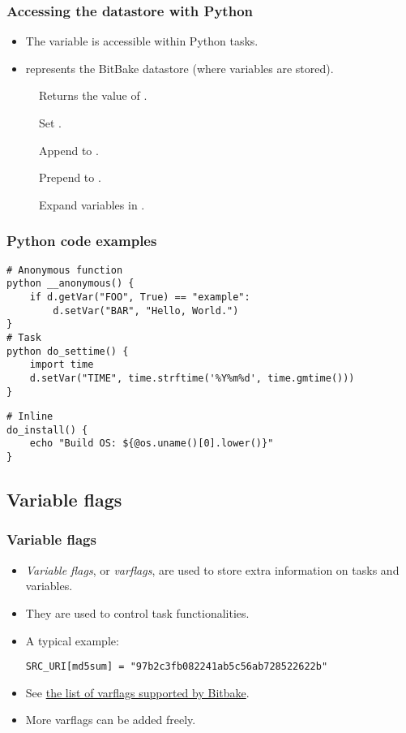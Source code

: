 \begin{frame}
  \frametitle{Accessing the datastore with Python}
  \begin{itemize}
    \item The  variable is accessible within Python tasks.
    \item {} represents the BitBake datastore (where variables are
      stored).
  \end{itemize}
  \begin{description}
    \item[] Returns the value of
      .
    \item[] Set .
    \item[] Append  to
      .
    \item[] Prepend  to
      .
    \item[] Expand variables in
      .
  \end{description}
\end{frame}

\begin{frame}[fragile]
  \frametitle{Python code examples}
  \begin{verbatim}
# Anonymous function
python __anonymous() {
    if d.getVar("FOO", True) == "example":
        d.setVar("BAR", "Hello, World.")
}
# Task
python do_settime() {
    import time
    d.setVar("TIME", time.strftime('%Y%m%d', time.gmtime()))
}
  \end{verbatim}
  \begin{verbatim}
# Inline
do_install() {
    echo "Build OS: ${@os.uname()[0].lower()}"
}

  \end{verbatim}
\end{frame}

\subsection{Variable flags}

\begin{frame}[fragile]
  \frametitle{Variable flags}
  \begin{itemize}
    \item {\em Variable flags}, or {\em varflags}, are used to store extra
      information on tasks and variables.
    \item They are used to control task functionalities.
    \item A typical example:
  \begin{verbatim}
SRC_URI[md5sum] = "97b2c3fb082241ab5c56ab728522622b"
  \end{verbatim}
  \item See
    \href{https://docs.yoctoproject.org/bitbake/2.2/bitbake-user-manual/bitbake-user-manual-metadata.html#variable-flags}{the list of varflags supported by Bitbake}.
  \item More varflags can be added freely.
  \end{itemize}
\end{frame}

